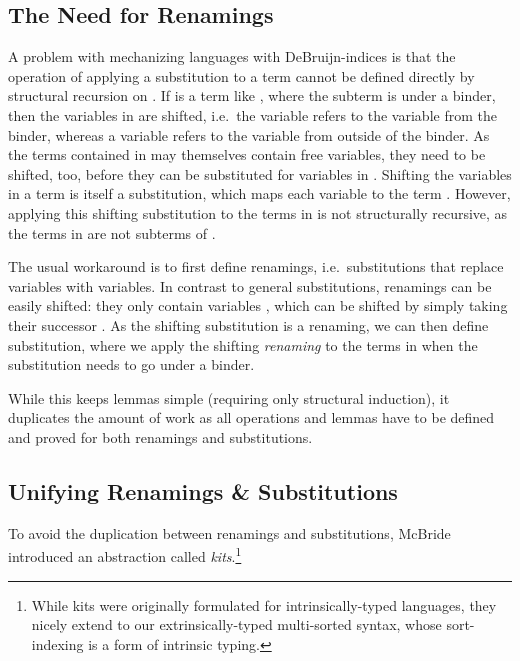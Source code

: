 \documentclass[sigplan,10pt]{acmart}
\newcommand*\ACode[1]{\AgdaFontStyle{\textcolor{mygray}{#1}}}
\newcommand*\ACon[1]{\AgdaInductiveConstructor{#1}}
\begin{document}
  \subsection{The Need for Renamings}
  A problem with mechanizing languages with DeBruijn-indices is that
  the operation of applying a substitution \ACode{σ} to a term
  \ACode{t} cannot be defined directly by structural recursion on
  \ACode{t}.
  If \ACode{t} is a term like \ACode{\ACon{λx} e},
  where the subterm \ACode{e} is under a binder, then the variables
  in \ACode{e} are shifted, i.e.\ the variable \ACode{\ACon{zero}} refers
  to the variable from the binder, whereas a variable \ACode{\ACon{suc} x}
  refers to the variable \ACode{x} from outside of the binder.
  As the terms contained in \ACode{σ} may themselves contain free variables,
  they need to be shifted, too, before they can be substituted
  for variables in \ACode{e}. 
  Shifting the variables in a term is itself a substitution, which maps
  each variable \ACode{x} to the term \ACode{\ACon{`} (\ACon{suc} x)}.
  However, applying this shifting substitution to the terms in
  \ACode{σ} is not structurally recursive, as the terms in \ACode{σ}
  are not subterms of \ACode{\ACon{λx} e}.

  The usual workaround is to first define renamings,
  i.e.\ substitutions that replace variables with variables.
  In contrast to general substitutions, renamings can be easily
  shifted: they only contain variables \ACode{x}, which can be
  shifted by simply taking their successor \ACode{\ACon{suc} x}.
  As the shifting substitution is a renaming, we can then define substitution,
  where we apply the shifting \emph{renaming} to the terms in \ACode{σ} when
  the substitution needs to go under a binder.

  While this keeps lemmas simple (requiring only structural induction),
  it duplicates the amount of work as all operations and lemmas have
  to be defined and proved for both renamings and substitutions.

  \subsection{Unifying Renamings \& Substitutions}
  To avoid the duplication between renamings and substitutions,
  McBride\cite{DBLP:journals/jar/BentonHKM12, unpublished:mcbride2005kits}
  introduced an abstraction called \emph{kits}.\footnote{
    While kits were originally formulated for intrinsically-typed languages,
    they nicely extend to our extrinsically-typed multi-sorted syntax, whose
    sort-indexing is a form of intrinsic typing.
  }
\end{document}

